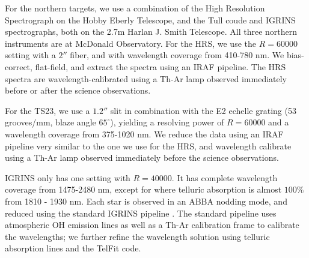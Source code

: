 \documentclass{emulateapj}
\begin{document}
For the northern targets, we use a combination of the High Resolution Spectrograph \citep[HRS,][]{HRS} on the Hobby Eberly Telescope, and the Tull coude \citep[TS23,][]{TS23} and IGRINS \citep{IGRINS} spectrographs, both on the 2.7m Harlan J. Smith Telescope. All three northern instruments are at McDonald Observatory. For the HRS, we use the $R = 60000$ setting with a $2''$ fiber, and with wavelength coverage from 410-780 nm. We bias-correct, flat-field, and extract the spectra using an IRAF pipeline. The HRS spectra are wavelength-calibrated using a Th-Ar lamp observed immediately before or after the science observations.

For the TS23, we use a $1.2''$ slit in combination with the E2 echelle grating (53 grooves/mm, blaze angle $65^{\circ}$), yielding a resolving power of $R=60000$ and a wavelength coverage from 375-1020 nm. We reduce the data using an IRAF pipeline very similar to the one we use for the HRS, and wavelength calibrate using a Th-Ar lamp observed immediately before the science observations.

IGRINS only has one setting with $R = 40000$. It has complete wavelength coverage from 1475-2480 nm, except for where telluric absorption is almost $100\%$ from 1810 - 1930 nm. Each star is observed in an ABBA nodding mode, and reduced using the standard IGRINS pipeline \citep{IGRINS_plp_v2}. The standard pipeline uses atmospheric OH emission lines as well as a Th-Ar calibration frame to calibrate the wavelengths; we further refine the wavelength solution using telluric absorption lines and the TelFit code.
\end{document}
